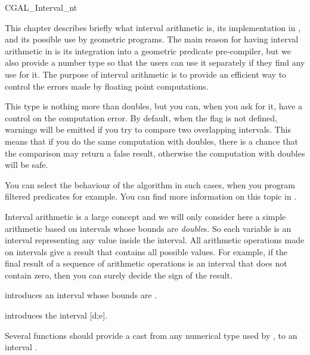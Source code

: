 \begin{ccClass} {CGAL_Interval_nt}
\label{interval}

This chapter describes briefly what interval arithmetic is, its implementation
in {\cgal}, and its possible use by geometric programs.
The main reason for having interval arithmetic in {\cgal} is its integration
into a geometric predicate pre-compiler, but we also provide a number type so
that the users can use it separately if they find any use for it.
The purpose of interval arithmetic is to provide an efficient way to
control the errors made by floating point computations.

This type is nothing more than doubles, but you can, when you ask for it, have
a control on the computation error.  By default, when the flag
 is not defined, warnings will be emitted if you try
to compare two overlapping intervals.  This means that if you do the same
computation with doubles, there is a chance that the comparison may return a
false result, otherwise the computation with doubles will be safe.

You can select the behaviour of the algorithm in such cases, when you program
filtered predicates for example.  You can find more information on this topic
in \cite{bbp-ia-98}.

\ccDefinition
Interval arithmetic is a large concept and we will only consider here a 
simple arithmetic based on intervals whose bounds are {\it double}s.
So each variable is an interval representing any value inside the interval.
All arithmetic operations made on intervals give a result that contains all
possible values.
For example, if the final result of a sequence of arithmetic operations is
an interval that does not contain zero, then you can surely decide the sign 
of the result.


\ccCreation

 {introduces an interval
whose bounds are .}

{introduces the interval [d;e].}

Several functions should provide a cast from any numerical type used by {\cgal},
to an interval .





\end{ccClass}
